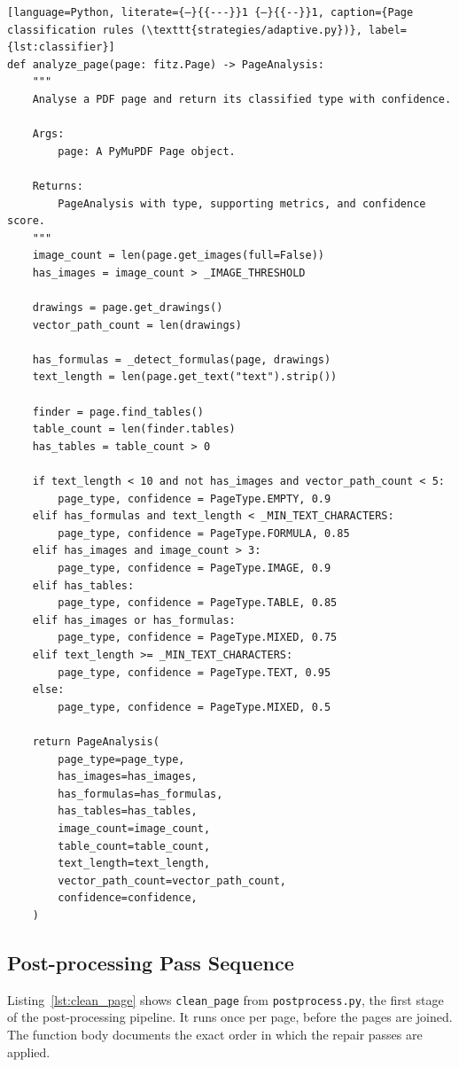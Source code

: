 \begin{lstlisting}[language=Python, literate={—}{{---}}1 {–}{{--}}1, caption={Page classification rules (\texttt{strategies/adaptive.py})}, label={lst:classifier}]
def analyze_page(page: fitz.Page) -> PageAnalysis:
    """
    Analyse a PDF page and return its classified type with confidence.

    Args:
        page: A PyMuPDF Page object.

    Returns:
        PageAnalysis with type, supporting metrics, and confidence score.
    """
    image_count = len(page.get_images(full=False))
    has_images = image_count > _IMAGE_THRESHOLD

    drawings = page.get_drawings()
    vector_path_count = len(drawings)

    has_formulas = _detect_formulas(page, drawings)
    text_length = len(page.get_text("text").strip())

    finder = page.find_tables()
    table_count = len(finder.tables)
    has_tables = table_count > 0

    if text_length < 10 and not has_images and vector_path_count < 5:
        page_type, confidence = PageType.EMPTY, 0.9
    elif has_formulas and text_length < _MIN_TEXT_CHARACTERS:
        page_type, confidence = PageType.FORMULA, 0.85
    elif has_images and image_count > 3:
        page_type, confidence = PageType.IMAGE, 0.9
    elif has_tables:
        page_type, confidence = PageType.TABLE, 0.85
    elif has_images or has_formulas:
        page_type, confidence = PageType.MIXED, 0.75
    elif text_length >= _MIN_TEXT_CHARACTERS:
        page_type, confidence = PageType.TEXT, 0.95
    else:
        page_type, confidence = PageType.MIXED, 0.5

    return PageAnalysis(
        page_type=page_type,
        has_images=has_images,
        has_formulas=has_formulas,
        has_tables=has_tables,
        image_count=image_count,
        table_count=table_count,
        text_length=text_length,
        vector_path_count=vector_path_count,
        confidence=confidence,
    )
\end{lstlisting}

\subsection{Post-processing Pass Sequence}

Listing~\ref{lst:clean_page} shows \texttt{clean\_page} from
\texttt{postprocess.py}, the first stage of the post-processing pipeline. It
runs once per page, before the pages are joined. The function body documents
the exact order in which the repair passes are applied.

